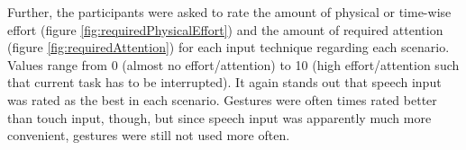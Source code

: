 \begin{figure}[h]
	\myfloatalign
	 \quad
	\caption{}
	\label{fig:controlAndUsage}
\end{figure}

\newpage

Further, the participants were asked to rate the amount of physical or time-wise effort (figure \ref{fig:requiredPhysicalEffort}) and the amount of required attention (figure \ref{fig:requiredAttention}) for each input technique regarding each scenario. Values range from 0 (almost no effort/attention) to 10 (high effort/attention such that current task has to be interrupted). It again stands out that speech input was rated as the best in each scenario. Gestures were often times rated better than touch input, though, but since speech input was apparently much more convenient, gestures were still not used more often.

